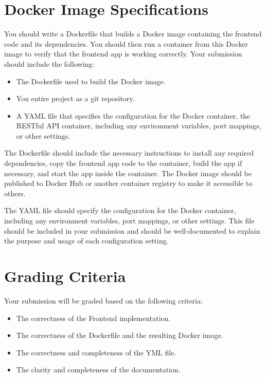 \documentclass{article}
\begin{document}
\section*{Docker Image Specifications}
You should write a Dockerfile that builds a Docker image containing the frontend code and its dependencies. You should then run a container from this Docker image to verify that the frontend app is working correctly. Your submission should include the following:

\begin{itemize}
\item The Dockerfile used to build the Docker image.
\item You entire project as a git repository.
\item A YAML file that specifies the configuration for the Docker container, the RESTful API container, including any environment variables, port mappings, or other settings.
\end{itemize}


The Dockerfile should include the necessary instructions to install any required dependencies, copy the frontend app code to the container, build the app if necessary, and start the app inside the container. The Docker image should be published to Docker Hub or another container registry to make it accessible to others.


The YAML file should specify the configuration for the Docker container, including any environment variables, port mappings, or other settings. This file should be included in your submission and should be well-documented to explain the purpose and usage of each configuration setting.


\section*{Grading Criteria}

Your submission will be graded based on the following criteria:

\begin{itemize}
	\item The correctness of the Frontend implementation.
	\item The correctness of the Dockerfile and the resulting Docker image.
	\item The correctness and completeness of the YML file.
	\item The clarity and completeness of the documentation.
\end{itemize}
\end{document}
